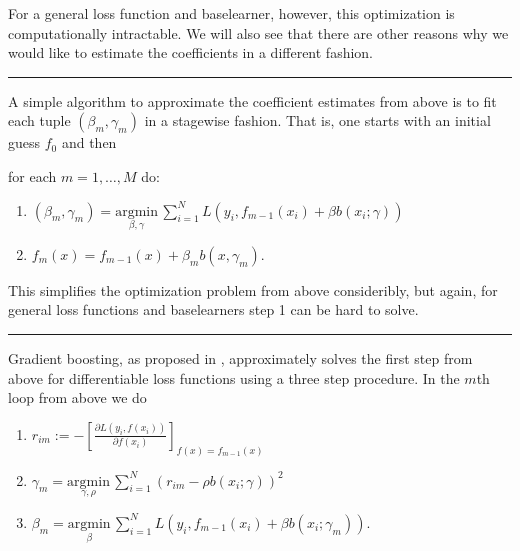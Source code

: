 \documentclass[letterpaper,10pt,english]{sphinxmanual}
\begin{document}
For a general loss function and base\sphinxhyphen{}learner, however, this optimization is computationally intractable. We will also see that there are other reasons why we would like to estimate the coefficients in a different fashion.


\bigskip\hrule\bigskip



A simple algorithm to approximate the coefficient estimates from above is to fit each tuple \((\beta_m, \gamma_m)\) in a stage\sphinxhyphen{}wise fashion. That is, one starts with an initial guess \(f_0\) and then

for each \(m=1,\dots, M\) do:
\begin{enumerate}
%
\item {} 
\((\beta_m, \gamma_m) = \underset{\beta, \gamma}{\text{argmin}} \, \sum_{i=1}^N L \left(y_i, f_{m-1}(x_i) + \beta b(x_i; \gamma) \right)\)

\item {} 
\(f_m(x) = f_{m-1}(x) + \beta_m b(x, \gamma_m)\).

\end{enumerate}

This simplifies the optimization problem from above consideribly, but again, for general loss functions and base\sphinxhyphen{}learners step 1 can be hard to solve.


\bigskip\hrule\bigskip



Gradient boosting, as proposed in , approximately solves the first step from above for differentiable loss functions using a three step procedure. In the \(m\)\sphinxhyphen{}th loop from above we do
\begin{enumerate}
%
\item {} 
\(r_{im} := - \left[\frac{\partial L(y_i, f(x_i))}{\partial f(x_i)}  \right]_{f(x) = f_{m-1}(x)}\)

\item {} 
\(\gamma_m = \underset{\gamma, \rho}{\text{argmin}} \, \sum_{i=1}^N \left(r_{im} - \rho b(x_i; \gamma) \right)^2\)

\item {} 
\(\beta_m = \underset{\beta}{\text{argmin}} \, \sum_{i=1}^N L \left(y_i, f_{m-1}(x_i) + \beta b(x_i; \gamma_m) \right)\).

\end{enumerate}
\end{document}
